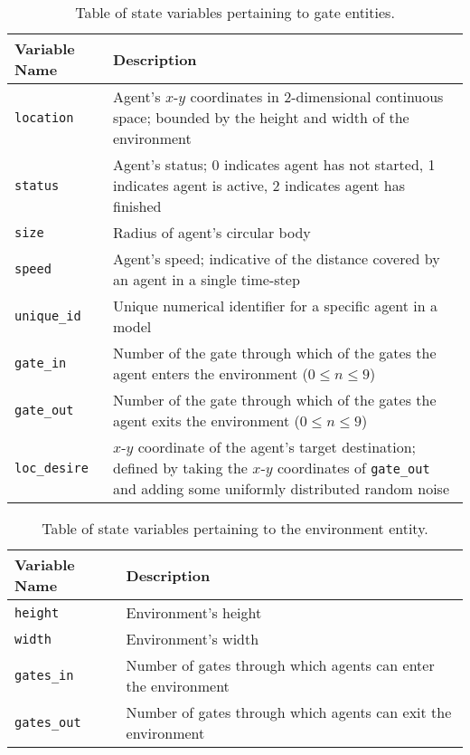 \begin{table}
    \centering
    \begin{tabularx}{\textwidth}{lX}
        \toprule
        Variable Name & Description \\
        \midrule
        \texttt{location} & Agent's $x$-$y$ coordinates in 2-dimensional
                            continuous space; bounded by the height and width of
                            the environment \\
        \texttt{status} & Agent's status; 0 indicates agent has not started, 1
                          indicates agent is active, 2 indicates agent has
                          finished \\
        \texttt{size} & Radius of agent's circular body \\
        \texttt{speed} & Agent's speed; indicative of the distance covered by an
                         agent in a single time-step \\
        \texttt{unique\_id} & Unique numerical identifier for a specific agent
                              in a model \\
        \texttt{gate\_in} & Number of the gate through which of the gates the
                            agent enters the environment ($0 \leq n \leq 9$) \\
        \texttt{gate\_out} & Number of the gate through which of the gates the
                             agent exits the environment ($0 \leq n \leq 9$) \\
        \texttt{loc\_desire} & $x$-$y$ coordinate of the agent's target
                               destination; defined by taking the $x$-$y$
                               coordinates of \texttt{gate\_out} and adding some
                               uniformly distributed random noise \\
        \bottomrule
    \end{tabularx}
    \caption{Table of state variables pertaining to gate
    entities.}\label{tab:agent_variables}
\end{table}

\begin{table}
    \centering
    \begin{tabularx}{\textwidth}{lX}
        \toprule
        Variable Name & Description \\
        \midrule
        \texttt{height} & Environment's height \\
        \texttt{width} & Environment's width \\
        \texttt{gates\_in} & Number of gates through which agents can enter the
                             environment \\
        \texttt{gates\_out} & Number of gates through which agents can exit the
                              environment \\
        \bottomrule
    \end{tabularx}
    \caption{Table of state variables pertaining to the environment
    entity.}\label{tab:environment_variables}
\end{table}

